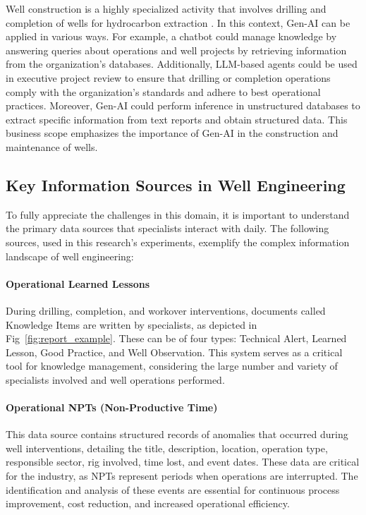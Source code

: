     Well construction is a highly specialized activity that involves drilling and completion of wells for hydrocarbon extraction \citep{Thomas2004}. In this context, Gen-AI can be applied in various ways. 
    For example, a chatbot could manage knowledge by answering queries about operations and well projects by retrieving information from the organization's databases. 
    Additionally, LLM-based agents could be used in executive project review to ensure that drilling or completion operations comply with the organization's standards and adhere to best operational practices. 
    Moreover, Gen-AI could perform inference in unstructured databases to extract specific information from text reports and obtain structured data. This business scope emphasizes the importance of Gen-AI in the construction and maintenance of wells.

    \subsection{Key Information Sources in Well Engineering} \label{sec:information-sources}

        To fully appreciate the challenges in this domain, it is important to understand the primary data sources that specialists interact with daily. The following sources, used in this research's experiments, exemplify the complex information landscape of well engineering:

        \paragraph{Operational Learned Lessons} During drilling, completion, and workover interventions, documents called Knowledge Items are written by specialists, as depicted in Fig~\ref{fig:report_example}. These can be of four types: Technical Alert, Learned Lesson, Good Practice, and Well Observation. This system serves as a critical tool for knowledge management, considering the large number and variety of specialists involved and well operations performed.

        \paragraph{Operational NPTs (Non-Productive Time)} This data source contains structured records of anomalies that occurred during well interventions, detailing the title, description, location, operation type, responsible sector, rig involved, time lost, and event dates. These data are critical for the industry, as NPTs represent periods when operations are interrupted. The identification and analysis of these events are essential for continuous process improvement, cost reduction, and increased operational efficiency.

